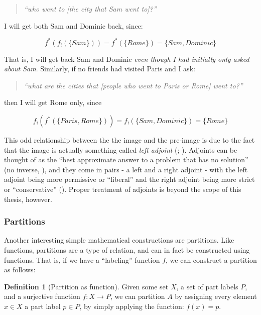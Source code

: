 \documentclass[
  openany]{book}
\theoremstyle{definition}
\newtheorem{definition}{Definition}[chapter]
\theoremstyle{definition}
\theoremstyle{definition}
\theoremstyle{definition}
\theoremstyle{remark}
\begin{document}
\begin{quote}
\emph{``who went to {[}the city that Sam went to{]}?''}
\end{quote}

I will get both Sam and Dominic back, since:

\[f^*(f_!(\{ Sam \})) = f^*(\{ Rome \}) = \{ Sam, Dominic \}\]

That is, I will get back Sam and Dominic \emph{even though I had initially only asked about Sam}. Similarly, if no friends had visited Paris and I ask:

\begin{quote}
\emph{``what are the cities that {[}people who went to Paris or Rome{]} went to?''}
\end{quote}

then I will get Rome only, since

\[f_!(f^*(\{Paris, Rome \})) = f_!(\{ Sam, Dominic \}) = \{ Rome \}\]

This odd relationship between the the image and the pre-image is due to the fact that the image is actually something called \emph{left adjoint} (; ). Adjoints can be thought of as the ``best approximate answer to a problem that has no solution'' (no inverse, ), and they come in pairs - a left and a right adjoint - with the left adjoint being more permissive or ``liberal'' and the right adjoint being more strict or ``conservative'' (). Proper treatment of adjoints is beyond the scope of this thesis, however.

\subsubsection{Partitions}\label{partitions}

Another interesting simple mathematical constructions are partitions. Like functions, partitions are a type of relation, and can in fact be constructed using functions. That is, if we have a ``labeling'' function \(f\), we can construct a partition as follows:

\begin{definition}[Partition as function]
Given some set \(X\), a set of part labels \(P\), and a surjective function \(f: X \to P\), we can partition \(A\) by assigning every element \(x \in X\) a part label \(p \in P\), by simply applying the function: \(f(x) = p\).
\end{definition}
\end{document}
